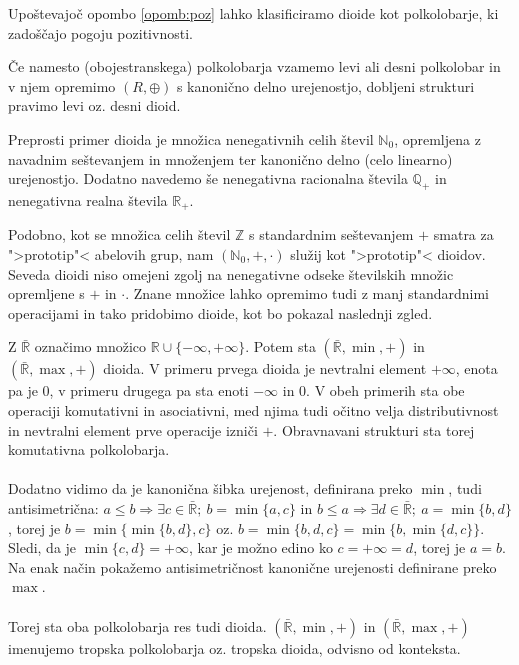 \documentclass[mat1]{fmfdelo}
\newcommand{\R}{\mathbb{R}}
\newcommand{\N}{\mathbb{N}}
\newcommand{\Z}{\mathbb{Z}}
\newcommand{\No}{\N_0}
\newcommand{\Pplus}[1]{\mathbb{#1}_{+}}
\begin{document}
	Upoštevajoč opombo \ref{opomb:poz} lahko klasificiramo dioide kot polkolobarje, ki zadoščajo pogoju pozitivnosti.
\begin{opomba}
	Če namesto (obojestranskega) polkolobarja vzamemo levi ali desni polkolobar in v njem opremimo $(R, \oplus)$ s kanonično delno urejenostjo, dobljeni strukturi pravimo levi oz. desni dioid.
\end{opomba}

Preprosti primer dioida je množica nenegativnih celih števil $\No$, opremljena z navadnim seštevanjem in množenjem ter kanonično delno (celo linearno) urejenostjo. Dodatno navedemo še nenegativna racionalna števila $\Pplus{Q}$ in nenegativna realna števila $\Pplus{R}$.

Podobno, kot se množica celih števil $\Z$ s standardnim seštevanjem $+$ smatra za ">prototip"< abelovih grup, nam $(\No, +, \cdot)$ služij kot ">prototip"< dioidov. Seveda dioidi niso omejeni zgolj na nenegativne odseke številskih množic opremljene s $+$ in $\cdot$. Znane množice lahko opremimo tudi z manj standardnimi operacijami in tako pridobimo dioide, kot bo pokazal naslednji zgled.

\begin{zgled}\label{zgled:tropdioid}
	Z $\bar{\R}$ označimo množico $\R \cup \{-\infty, +\infty\}$. Potem sta $(\bar{\R}, \min, +)$ in $(\bar{\R}, \max, +)$ dioida. V primeru prvega dioida je nevtralni element $+\infty$, enota pa je $0$, v primeru drugega pa sta enoti $-\infty$ in $0$. V obeh primerih sta obe operaciji komutativni in asociativni, med njima tudi očitno velja distributivnost in nevtralni element prve operacije izniči $+$. Obravnavani strukturi sta torej komutativna polkolobarja.\\
	\\
	 Dodatno vidimo da je kanonična šibka urejenost, definirana preko $\min$, tudi antisimetrična: $a\leq b \Rightarrow \exists c\in \bar{\R};~b = \min\{a, c\}$ in $b\leq a \Rightarrow \exists d\in \bar{\R};~a = \min\{b, d\}$, torej je $b = \min\{\min\{b, d\}, c\}$ oz. $b = \min\{b, d, c\} = \min\{b, \min\{d, c\}\}$. Sledi, da je $\min\{c, d\} = +\infty$, kar je možno edino ko $c = +\infty = d$, torej je $a = b$. Na enak način pokažemo antisimetričnost kanonične urejenosti definirane preko $\max$. \\
	\\
	Torej sta oba polkolobarja res tudi dioida. $(\bar{\R}, \min, +)$ in $(\bar{\R}, \max, +)$ imenujemo tropska polkolobarja oz. tropska dioida, odvisno od konteksta.
\end{zgled}
\end{document}
